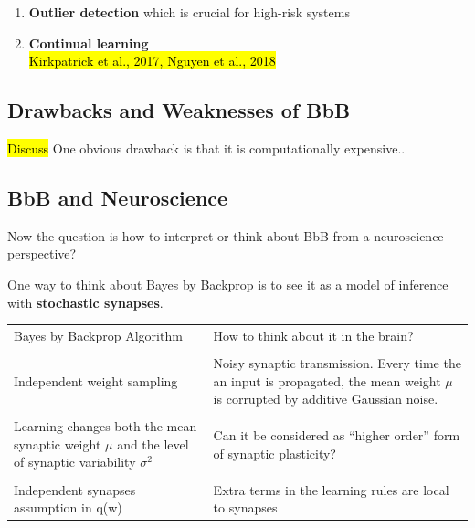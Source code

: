 \documentclass[main]{subfiles}
\begin{document}
\begin{enumerate}
    \item \textbf{Outlier detection} which is crucial for high-risk systems
    \item \textbf{Continual learning}\\
        \hl{Kirkpatrick et al., 2017, Nguyen et al., 2018}
\end{enumerate}

\subsection{Drawbacks and Weaknesses of BbB}
\hl{Discuss}
One obvious drawback is that it is computationally expensive..

\subsection{BbB and Neuroscience}
Now the question is how to interpret or think about BbB from a neuroscience perspective?

\noindent One way to think about Bayes by Backprop is to see it as a model of inference with \textbf{stochastic synapses}.

\begin{center}
    \begin{tabular}{|p{5cm}|p{7cm}|}
    \hline
     Bayes by Backprop Algorithm & How to think about it in the brain?\\\\
     \hline
     \hline
    Independent weight sampling &  Noisy synaptic transmission. Every time the an input is propagated, the mean weight $\mu$ is corrupted by additive Gaussian noise.\\
    \hline\\
    Learning changes both the mean synaptic weight $\mu$ and the level of synaptic variability $\sigma^2$ & Can it be considered as “higher order” form of synaptic plasticity?  \\ 
    \hline\\
    Independent synapses assumption in q(w) &  Extra terms in the learning rules are local to synapses \\ 
    \hline
    \end{tabular}
\end{center}
\end{document}
